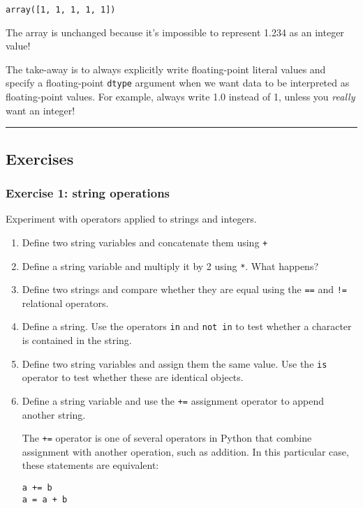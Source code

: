 \documentclass[10pt]{scrartcl}
\makeatletter
\newcommand{\boxspacing}{\kern\kvtcb@left@rule\kern\kvtcb@boxsep}
\newcommand{\prompt}[4]{
        {\ttfamily\llap{{\color{#2}[#3]:\hspace{3pt}#4}}\vspace{-\baselineskip}}
    }
\makeatother
\begin{document}
            \begin{tcolorbox}[breakable, size=fbox, boxrule=.5pt, pad at break*=1mm, opacityfill=0]
\prompt{Out}{outcolor}{56}{\boxspacing}
\begin{Verbatim}[commandchars=\\\{\}]
array([1, 1, 1, 1, 1])
\end{Verbatim}
\end{tcolorbox}
        
    The array is unchanged because it's impossible to represent 1.234 as an
integer value!

The take-away is to always explicitly write floating-point literal
values and specify a floating-point \texttt{dtype} argument when we want
data to be interpreted as floating-point values. For example, always
write 1.0 instead of 1, unless you \emph{really} want an integer!

    \begin{center}\rule{0.5\linewidth}{0.5pt}\end{center}

\hypertarget{exercises}{%
\subsection{Exercises}\label{exercises}}

    \hypertarget{exercise-1-string-operations}{%
\subsubsection{Exercise 1: string
operations}\label{exercise-1-string-operations}}

Experiment with operators applied to strings and integers.

\begin{enumerate}
\def\labelenumi{\arabic{enumi}.}
\item
  Define two string variables and concatenate them using \texttt{+}
\item
  Define a string variable and multiply it by 2 using \texttt{*}. What
  happens?
\item
  Define two strings and compare whether they are equal using the
  \texttt{==} and \texttt{!=} relational operators.
\item
  Define a string. Use the operators \texttt{in} and \texttt{not\ in} to
  test whether a character is contained in the string.
\item
  Define two string variables and assign them the same value. Use the
  \texttt{is} operator to test whether these are identical objects.
\item
  Define a string variable and use the \texttt{+=} assignment operator
  to append another string.

  The \texttt{+=} operator is one of several operators in Python that
  combine assignment with another operation, such as addition. In this
  particular case, these statements are equivalent:

\begin{verbatim}
a += b
a = a + b
\end{verbatim}
\end{enumerate}
\end{document}
